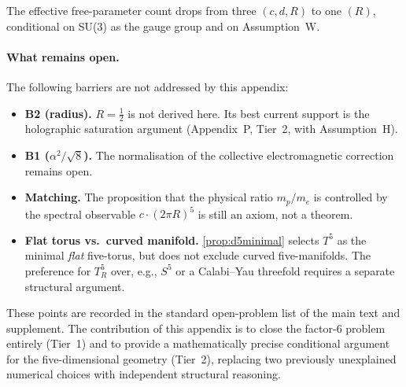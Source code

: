 \noindent
The effective free-parameter count drops from three $(c, d, R)$
to one $(R)$, conditional on SU(3) as the gauge group and on
Assumption~W.

\paragraph{What remains open.}
The following barriers are not addressed by this appendix:
\begin{itemize}[leftmargin=1.5em]
  \item \textbf{B2 (radius).} $R=\tfrac{1}{2}$ is not derived here.
        Its best current support is the holographic saturation
        argument (Appendix~P, Tier~2, with Assumption~H).
  \item \textbf{B1 ($\alpha^2/\sqrt{8}$).}  The normalisation of the
        collective electromagnetic correction remains open.
  \item \textbf{Matching.}  The proposition that the physical ratio
        $m_p/m_e$ is controlled by the spectral observable
        $c\cdot(2\pi R)^5$ is still an axiom, not a theorem.
  \item \textbf{Flat torus vs.\ curved manifold.}
        \cref{prop:d5minimal} selects $T^5$ as the minimal \emph{flat}
        five-torus, but does not exclude curved five-manifolds.
        The preference for $T^5_R$ over, e.g., $S^5$ or a Calabi--Yau
        threefold requires a separate structural argument.
\end{itemize}

These points are recorded in the standard open-problem list of the
main text and supplement.  The contribution of this appendix is to
close the factor-$6$ problem entirely (Tier~1) and to provide a
mathematically precise conditional argument for the five-dimensional
geometry (Tier~2), replacing two previously unexplained numerical
choices with independent structural reasoning.
